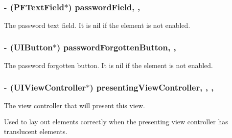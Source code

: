 \subsubsection[{password\+Field}]{\setlength{\rightskip}{0pt plus 5cm}-\/ ({\bf P\+F\+Text\+Field}$\ast$) password\+Field\hspace{0.3cm}{\ttfamily [read]}, {\ttfamily [nonatomic]}, {\ttfamily [strong]}}\label{interface_p_f_log_in_view_af2a3676f5d1bfaa67de4b48a6bd358b7}
The password text field. It is {\ttfamily nil} if the element is not enabled. \hypertarget{interface_p_f_log_in_view_a15c2c32b5a78348e75399cedb99b6968}{}
\subsubsection[{password\+Forgotten\+Button}]{\setlength{\rightskip}{0pt plus 5cm}-\/ (U\+I\+Button$\ast$) password\+Forgotten\+Button\hspace{0.3cm}{\ttfamily [read]}, {\ttfamily [nonatomic]}, {\ttfamily [strong]}}\label{interface_p_f_log_in_view_a15c2c32b5a78348e75399cedb99b6968}
The password forgotten button. It is {\ttfamily nil} if the element is not enabled. \hypertarget{interface_p_f_log_in_view_a9743c6a9acbb86749fe2dc6d50447552}{}
\subsubsection[{presenting\+View\+Controller}]{\setlength{\rightskip}{0pt plus 5cm}-\/ (U\+I\+View\+Controller$\ast$) presenting\+View\+Controller\hspace{0.3cm}{\ttfamily [read]}, {\ttfamily [write]}, {\ttfamily [nonatomic]}, {\ttfamily [weak]}}\label{interface_p_f_log_in_view_a9743c6a9acbb86749fe2dc6d50447552}
The view controller that will present this view.

Used to lay out elements correctly when the presenting view controller has translucent elements. \hypertarget{interface_p_f_log_in_view_aca49da3d4d6b0e7aa6264953dc74f47a}{}
